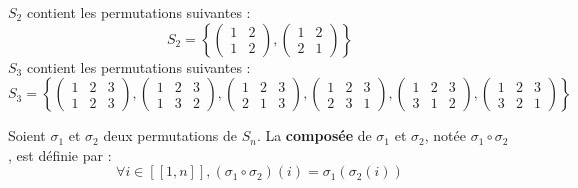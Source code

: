 \documentclass[11pt,a4paper]{report}
\begin{document}
\begin{example}
    $S_2$ contient les permutations suivantes :
    \[
        S_2 = \left\{\left(\begin{matrix} 1 & 2 \\ 1 & 2 \end{matrix}\right), \left(\begin{matrix} 1 & 2 \\ 2 & 1 \end{matrix}\right)\right\}
    \]
    $S_3$ contient les permutations suivantes :
    \[
        S_3 = \left\{\left(\begin{matrix} 1 & 2 & 3 \\ 1 & 2 & 3 \end{matrix}\right), \left(\begin{matrix} 1 & 2 & 3 \\ 1 & 3 & 2 \end{matrix}\right), \left(\begin{matrix} 1 & 2 & 3 \\ 2 & 1 & 3 \end{matrix}\right), \left(\begin{matrix} 1 & 2 & 3 \\ 2 & 3 & 1 \end{matrix}\right), \left(\begin{matrix} 1 & 2 & 3 \\ 3 & 1 & 2 \end{matrix}\right), \left(\begin{matrix} 1 & 2 & 3 \\ 3 & 2 & 1 \end{matrix}\right)\right\}
    \]
\end{example}

\begin{definition}
    Soient $\sigma_1$ et $\sigma_2$ deux permutations de $S_n$. La \textbf{composée} de $\sigma_1$ et $\sigma_2$, notée $\sigma_1 \circ \sigma_2$, est définie par :
    $$\forall i \in [\![1,n]\!], (\sigma_1 \circ \sigma_2)(i) = \sigma_1(\sigma_2(i))$$
\end{definition}
\end{document}
